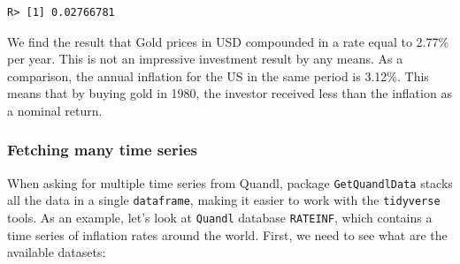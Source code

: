 \documentclass[
  12pt,
]{book}
\newenvironment{Shaded}{\begin{snugshade}}{\end{snugshade}}
\newcommand{\CommentTok}[1]{\textcolor[rgb]{0.37,0.37,0.37}{\textit{#1}}}
\newcommand{\DataTypeTok}[1]{\textcolor[rgb]{0.27,0.27,0.27}{#1}}
\newcommand{\DecValTok}[1]{\textcolor[rgb]{0.06,0.06,0.06}{#1}}
\newcommand{\KeywordTok}[1]{\textcolor[rgb]{0.27,0.27,0.27}{\textbf{#1}}}
\newcommand{\NormalTok}[1]{#1}
\newcommand{\OperatorTok}[1]{\textcolor[rgb]{0.43,0.43,0.43}{\textbf{#1}}}
\newcommand{\StringTok}[1]{\textcolor[rgb]{0.5,0.5,0.5}{#1}}
\begin{document}
\begin{Shaded}
\end{Shaded}

\begin{verbatim}
R> [1] 0.02766781
\end{verbatim}

We find the result that Gold prices in USD compounded in a rate equal to 2.77\% per year. This is not an impressive investment result by any means. As a comparison, the annual inflation for the US in the same period is 3.12\%. This means that by buying gold in 1980, the investor received less than the inflation as a nominal return.

\hypertarget{fetching-many-time-series}{%
\subsubsection{Fetching many time series}\label{fetching-many-time-series}}

When asking for multiple time series from Quandl, package \texttt{GetQuandlData} stacks all the data in a single \texttt{dataframe}, making it easier to work with the \texttt{tidyverse} tools. As an example, let's look at \texttt{Quandl} database \texttt{RATEINF}, which contains a time series of inflation rates around the world. First, we need to see what are the available datasets:
\end{document}
